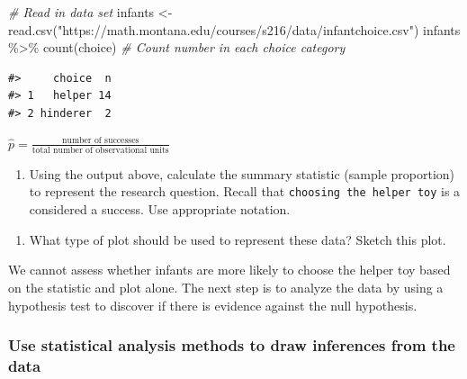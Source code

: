 \documentclass[
]{report}
\newenvironment{Shaded}{\begin{snugshade}}{\end{snugshade}}
\newcommand{\CommentTok}[1]{\textcolor[rgb]{0.56,0.35,0.01}{\textit{#1}}}
\newcommand{\FunctionTok}[1]{\textcolor[rgb]{0.00,0.00,0.00}{#1}}
\newcommand{\NormalTok}[1]{#1}
\newcommand{\OtherTok}[1]{\textcolor[rgb]{0.56,0.35,0.01}{#1}}
\newcommand{\SpecialCharTok}[1]{\textcolor[rgb]{0.00,0.00,0.00}{#1}}
\newcommand{\StringTok}[1]{\textcolor[rgb]{0.31,0.60,0.02}{#1}}
\providecommand{\tightlist}{%
  \setlength{\itemsep}{0pt}\setlength{\parskip}{0pt}}
\begin{document}
\begin{Shaded}
\begin{Highlighting}[]
 \CommentTok{\# Read in data set}
\NormalTok{infants }\OtherTok{\textless{}{-}} \FunctionTok{read.csv}\NormalTok{(}\StringTok{"https://math.montana.edu/courses/s216/data/infantchoice.csv"}\NormalTok{)}
\NormalTok{infants }\SpecialCharTok{\%\textgreater{}\%} \FunctionTok{count}\NormalTok{(choice)  }\CommentTok{\# Count number in each choice category}
\end{Highlighting}
\end{Shaded}

\begin{verbatim}
#>     choice  n
#> 1   helper 14
#> 2 hinderer  2
\end{verbatim}

\(\hat{p} = \frac{\mbox{number of successes}}{\mbox{total number of observational units}}\)

\begin{enumerate}
\def\labelenumi{\arabic{enumi}.}
\setcounter{enumi}{2}
\tightlist
\item
  Using the output above, calculate the summary statistic (sample proportion) to represent the research question. Recall that \texttt{choosing\ the\ helper\ toy} is a considered a success. Use appropriate notation.
\end{enumerate}

\vspace{0.5in}

\begin{enumerate}
\def\labelenumi{\arabic{enumi}.}
\setcounter{enumi}{3}
\tightlist
\item
  What type of plot should be used to represent these data? Sketch this plot.
\end{enumerate}

\vspace{1.5in}

We cannot assess whether infants are more likely to choose the helper toy based on the statistic and plot alone. The next step is to analyze the data by using a hypothesis test to discover if there is evidence against the null hypothesis.

\hypertarget{use-statistical-analysis-methods-to-draw-inferences-from-the-data}{%
\subsubsection*{Use statistical analysis methods to draw inferences from the data}\label{use-statistical-analysis-methods-to-draw-inferences-from-the-data}}
\end{document}
